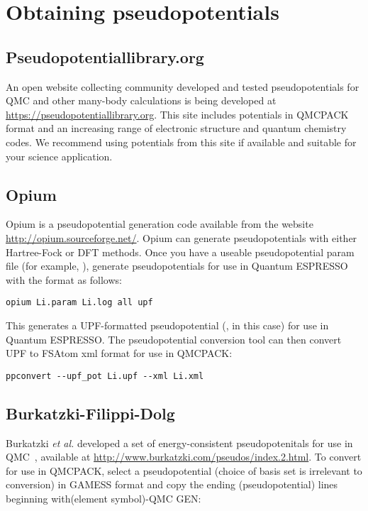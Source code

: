 \section{Obtaining pseudopotentials}

\subsection{Pseudopotentiallibrary.org}

An open website collecting community developed and tested
pseudopotentials for QMC and other many-body calculations is being
developed at \url{https://pseudopotentiallibrary.org}. This site
includes potentials in QMCPACK format and an increasing range of
electronic structure and quantum chemistry codes. We recommend using
potentials from this site if available and suitable for your science
application.

\subsection{Opium}
\label{subsec:opium}

Opium is a pseudopotential generation code available from the website \url{http://opium.sourceforge.net/}.  Opium can generate pseudopotentials with either Hartree-Fock or DFT methods.  Once you have a useable pseudopotential param file (for example, ), generate pseudopotentials for use in Quantum ESPRESSO with the  format as follows:
\begin{lstlisting}[style=SHELL,caption=Generate UPF-formatted pseudopotential with Opium]
opium Li.param Li.log all upf
\end{lstlisting}
This generates a UPF-formatted pseudopotential (, in this case) for use in Quantum ESPRESSO.  The pseudopotential conversion tool  can then convert UPF to FSAtom xml format for use in QMCPACK:
\begin{lstlisting}[caption=Convert UPF-formatted pseudopotential to FSAtom xml format]
ppconvert --upf_pot Li.upf --xml Li.xml
\end{lstlisting}

\subsection{Burkatzki-Filippi-Dolg}
\label{subsec:BFD}

Burkatzki \textit{et al.} developed a set of energy-consistent pseudopotenitals for use in QMC~\cite{Burkatzki07,Burkatzki08}, available at \url{http://www.burkatzki.com/pseudos/index.2.html}.  To convert for use in QMCPACK, select a pseudopotential (choice of basis set is irrelevant to conversion) in GAMESS format and copy the ending (pseudopotential) lines beginning with(element symbol)-QMC GEN:

